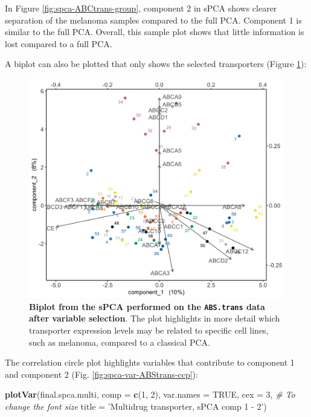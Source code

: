 \documentclass[]{book}
\newenvironment{Shaded}{\begin{snugshade}}{\end{snugshade}}
\newcommand{\CommentTok}[1]{\textcolor[rgb]{0.56,0.35,0.01}{\textit{#1}}}
\newcommand{\DataTypeTok}[1]{\textcolor[rgb]{0.13,0.29,0.53}{#1}}
\newcommand{\DecValTok}[1]{\textcolor[rgb]{0.00,0.00,0.81}{#1}}
\newcommand{\KeywordTok}[1]{\textcolor[rgb]{0.13,0.29,0.53}{\textbf{#1}}}
\newcommand{\NormalTok}[1]{#1}
\newcommand{\OperatorTok}[1]{\textcolor[rgb]{0.81,0.36,0.00}{\textbf{#1}}}
\newcommand{\OtherTok}[1]{\textcolor[rgb]{0.56,0.35,0.01}{#1}}
\newcommand{\StringTok}[1]{\textcolor[rgb]{0.31,0.60,0.02}{#1}}
\begin{document}
In Figure \ref{fig:spca-ABCtrans-group}, component 2 in sPCA shows clearer separation of the melanoma samples compared to the full PCA. Component 1 is similar to the full PCA. Overall, this sample plot shows that little information is lost compared to a full PCA.

A biplot can also be plotted that only shows the selected transporters (Figure \ref{fig:spca-ABCtrans-biplot}):

\begin{Shaded}
\end{Shaded}

\begin{figure}

{\centering \includegraphics[width=0.5\linewidth]{Figures/PCA/spca-ABCtrans-biplot-1} 

}

\caption{\textbf{Biplot from the sPCA performed on the \texttt{ABS.trans} data after variable selection}. The plot highlights in more detail which transporter expression levels may be related to specific cell lines, such as melanoma, compared to a classical PCA.}\label{fig:spca-ABCtrans-biplot}
\end{figure}



The correlation circle plot highlights variables that contribute to component 1 and component 2 (Fig. \ref{fig:spca-var-ABStrans-ccp}):

\begin{Shaded}
\begin{Highlighting}[]
\KeywordTok{plotVar}\NormalTok{(final.spca.multi, }\DataTypeTok{comp =} \KeywordTok{c}\NormalTok{(}\DecValTok{1}\NormalTok{, }\DecValTok{2}\NormalTok{), }\DataTypeTok{var.names =} \OtherTok{TRUE}\NormalTok{, }
        \DataTypeTok{cex =} \DecValTok{3}\NormalTok{, }\CommentTok{# To change the font size }
        \DataTypeTok{title =} \StringTok{'Multidrug transporter, sPCA comp 1 - 2'}\NormalTok{)}
\end{Highlighting}
\end{Shaded}
\end{document}
